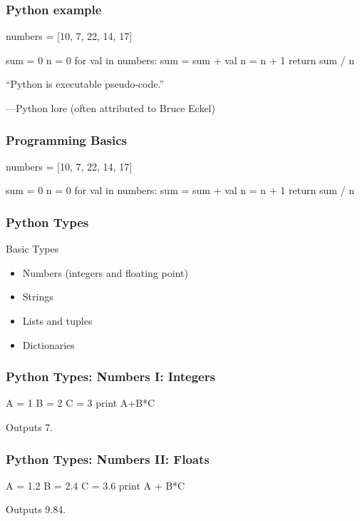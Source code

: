 \begin{frame}[fragile]
\frametitle{Python example}

\begin{python}
numbers = [10, 7, 22, 14, 17]

sum = 0
n = 0
for val in numbers:
    sum = sum + val
    n = n + 1
return sum / n
\end{python}

\end{frame}

\begin{frame}[fragile]
``Python is executable pseudo-code.''

---Python lore (often attributed to Bruce Eckel)

\end{frame}


\begin{frame}[fragile]
\frametitle{Programming Basics}

\begin{python}
numbers = [10, 7, 22, 14, 17]

sum = 0
n = 0
for val in numbers:
    sum = sum + val
    n = n + 1
return sum / n
\end{python}

\end{frame}


\begin{frame}[fragile]
\frametitle{Python Types}
\begin{block}{Basic Types}
\begin{itemize}
\item Numbers (integers and floating point)
\item Strings
\item Lists and tuples
\item Dictionaries
\end{itemize}
\end{block}
\end{frame}


\begin{frame}[fragile]
\frametitle{Python Types: Numbers I: Integers}
\begin{python}
A = 1
B = 2
C = 3
print A+B*C
\end{python}

Outputs \alert{7}.
\end{frame}

\begin{frame}[fragile]
\frametitle{Python Types: Numbers II: Floats}
\begin{python}
A = 1.2
B = 2.4
C = 3.6
print A + B*C
\end{python}

Outputs \alert{9.84}.
\end{frame}


